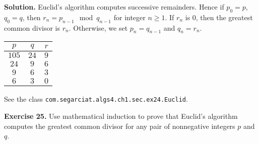 \documentclass[12pt, a4paper]{article}
\newenvironment{ex}[2][Exercise]
{\par\medskip\noindent \textbf{#1 #2.}}
{\medskip}
\newenvironment{sol}[1][Solution]
{\par\medskip\noindent \textbf{#1.} }
{\medskip}
\begin{document}
	\begin{sol}
		Euclid's algorithm computes successive remainders. Hence if $p_0=p$, $q_0=q$,
		then $r_{n} = p_{n-1}\mod q_{n-1}$ for integer $n\geq 1$. If $r_n$ is $0$, then
		the greatest common divisor is $r_n$. Otherwise, we set $p_n = q_{n-1}$ and $q_n = r_{n}$.
		\begin{center}
			\begin{tabular}{c|c|c}
				$p$ & $q$ & $r$ \\
				\hline
				$105$ &  $24$ & $9$ \\
				$24$ & $9$ & $6$ \\
				$9$ & $6$ & $3$ \\
				$6$ & $3$ & $0$
			\end{tabular}
		\end{center}
		See the class \texttt{com.segarciat.algs4.ch1.sec.ex24.Euclid}.
	\end{sol}
	\begin{ex}{25}
		Use mathematical induction to prove that Euclid's  algorithm computes  the  greatest
		common  divisor for any pair of nonnegative integers $p$ and $q$.
	\end{ex}
\end{document}
